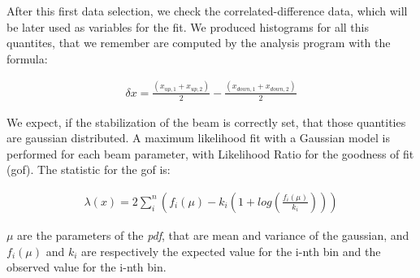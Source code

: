 \begin{figure}[hbtp]
\centering
{}
\end{figure}

After this first data selection, we check the correlated-difference data, which will be later used as variables for the fit. We produced histograms for all this quantites, that we remember are computed by the analysis program with the formula:

\begin{align*}
\delta x =  \frac{(x_{up,1} + x_{up,2})}{2} - \frac{(x_{down,1} + x_{down,2})}{2}
\end{align*}

We expect, if the stabilization of the beam is correctly set, that those quantities are gaussian distributed. A maximum likelihood fit with a Gaussian model is performed for each beam parameter, with Likelihood Ratio for the goodness of fit (gof). The statistic for the gof is:

\begin{align*}
\lambda(x) = 2 \sum_{i}^{n} (f_{i}(\mu) - k_{i}(1 + log(\frac{f_{i}(\mu)}{k_{i}})))
\end{align*}  

$\mu$ are the parameters of the \textit{pdf}, that are mean and variance of the gaussian, and $f_{i}(\mu)$ and $k_{i}$ are respectively the expected value for the i-nth bin and the observed value for the i-nth bin.

